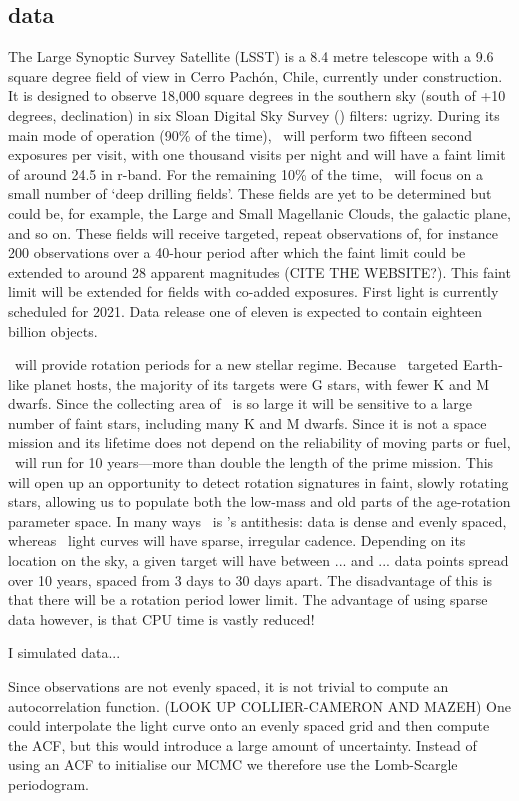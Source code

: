 \subsection{\LSST data}
The Large Synoptic Survey Satellite (LSST) is a 8.4 metre telescope with a 9.6
square degree field of view in Cerro Pach\'{o}n, Chile, currently under
construction.
It is designed to observe 18,000 square degrees in the southern sky (south of
+10 degrees, declination) in six Sloan Digital Sky Survey (\SDSS) filters:
ugrizy.
During its main mode of operation (90\% of the time), \LSST\ will perform two
fifteen second exposures per visit, with one thousand visits per night and
will have a faint limit of around 24.5 in r-band.
For the remaining 10\% of the time, \LSST\ will focus on a small number of
`deep drilling fields'.
These fields are yet to be determined but could be, for example, the Large and
Small Magellanic Clouds, the galactic plane, and so on.
These fields will receive targeted, repeat observations of, for instance 200
observations over a 40-hour period after which the faint limit could be
extended to around 28 apparent magnitudes (CITE THE WEBSITE?).
This faint limit will be extended for fields with co-added exposures.
First light is currently scheduled for 2021.
Data release one of eleven is expected to contain eighteen billion objects.

\LSST\ will provide rotation periods for a new stellar regime.
Because \kepler\ targeted Earth-like planet hosts, the majority of its
targets were G stars, with fewer K and M dwarfs.
Since the collecting area of \LSST\ is so large it will be sensitive to a
large number of faint stars, including many K and M dwarfs.
Since it is not a space mission and its lifetime does not depend on the
reliability of moving parts or fuel, \LSST\ will run for 10 years---more than
double the length of the \kepler prime mission.
This will open up an opportunity to detect rotation signatures in faint,
slowly rotating stars, allowing us to populate both the low-mass and old parts
of the age-rotation parameter space.
In many ways \LSST\ is \kepler's antithesis: \kepler data is dense and evenly
spaced, whereas \LSST\ light curves will have sparse, irregular cadence.
Depending on its location on the sky, a given target will have between ... and
... data points spread over 10 years, spaced from 3 days to 30 days apart.
The disadvantage of this is that there will be a rotation period lower limit.
The advantage of using sparse data however, is that CPU time is vastly
reduced!

I simulated \LSST data...

Since \LSST observations are not evenly spaced, it is not trivial to compute
an autocorrelation function.
(LOOK UP COLLIER-CAMERON AND MAZEH)
One could interpolate the light curve onto an evenly spaced grid and then
compute the ACF, but this would introduce a large amount of uncertainty.
Instead of using an ACF to initialise our MCMC we therefore use the
Lomb-Scargle periodogram.

